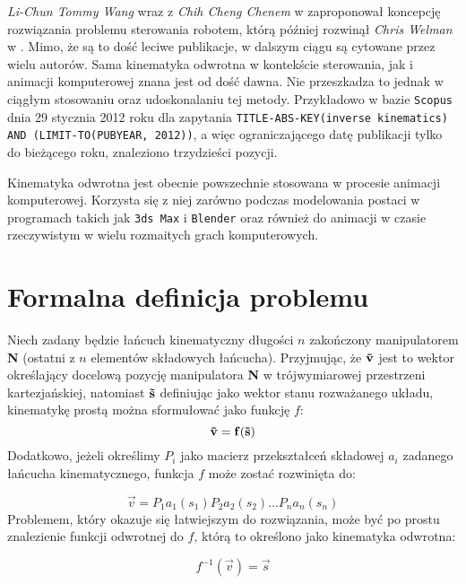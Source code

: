 \documentclass[11pt]{mwrep}
\begin{document}
  \textit{Li-Chun Tommy Wang} wraz z \textit{Chih Cheng Chenem} w \cite{ikrobot} zaproponował koncepcję rozwiązania problemu sterowania robotem, którą później rozwinął \textit{Chris Welman} w \cite{welman}. Mimo, że są to dość leciwe publikacje, w dalszym ciągu są cytowane przez wielu autorów. Sama kinematyka odwrotna w kontekście sterowania, jak i animacji komputerowej znana jest od dość dawna. Nie przeszkadza to jednak w ciągłym stosowaniu oraz udoskonalaniu tej metody. Przykładowo w bazie \texttt{Scopus} dnia 29 stycznia 2012 roku dla zapytania \verb|TITLE-ABS-KEY(inverse kinematics) AND (LIMIT-TO(PUBYEAR, 2012))|, a więc ograniczającego datę publikacji tylko do bieżącego roku, znaleziono trzydzieści pozycji.

  Kinematyka odwrotna jest obecnie powszechnie stosowana w procesie animacji komputerowej. Korzysta się z niej zarówno podczas modelowania postaci w programach takich jak \texttt{3ds Max} i \texttt{Blender} oraz również do animacji w czasie rzeczywistym w wielu rozmaitych grach komputerowych.
  
\section{Formalna definicja problemu}

 Niech zadany będzie łańcuch kinematyczny długości $n$ zakończony manipulatorem \textbf{N} (ostatni z $n$ elementów składowych łańcucha). Przyjmując, że $\bf\vec{v}$ jest to wektor określający docelową pozycję manipulatora \textbf{N} w trójwymiarowej przestrzeni kartezjańskiej, natomiast $\bf\vec{s}$ definiując jako wektor stanu rozważanego układu, kinematykę prostą można sformułować jako funkcję $f$:
$$
\bf\vec{v} = f(\bf\vec{s})
$$
Dodatkowo, jeżeli określimy $P_i$ jako macierz przekształceń składowej $a_i$ zadanego łańcucha kinematycznego, funkcja $f$ może zostać rozwinięta do:

$$
{\vec{v}} = P_1a_1({s_1})P_2a_2({s_2}) \dots P_na_n({s_n})
$$
Problemem, który okazuje się łatwiejszym do rozwiązania, może być po prostu znalezienie funkcji odwrotnej do $f$, którą to określono jako kinematyka odwrotna:

$$
f^{-1} (\vec{v})  = \vec{s}
$$
\end{document}
